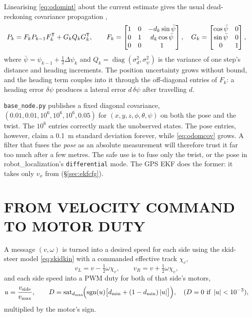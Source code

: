 Linearising \eqref{eq:odomint} about the current estimate gives the usual
dead-reckoning covariance propagation \cite{thrun2005probabilistic},
\begin{equation}\label{eq:odomcov}
P_k = F_k P_{k-1}F_k^{\mathsf T} + G_k Q_k G_k^{\mathsf T},\qquad
F_k=\begin{bmatrix}1&0&-d_k\sin\bar\psi\\0&1&d_k\cos\bar\psi\\0&0&1\end{bmatrix},\quad
G_k=\begin{bmatrix}\cos\bar\psi&0\\\sin\bar\psi&0\\0&1\end{bmatrix},
\end{equation}
where $\bar\psi=\psi_{k-1}+\frac12\Delta\psi_k$ and
$Q_k=\operatorname{diag}(\sigma_d^2,\sigma_{\psi}^2)$ is the variance of one
step's distance and heading increments. The position uncertainty grows
without bound, and the heading term couples into it through the off-diagonal
entries of $F_k$: a heading error $\delta\psi$ produces a lateral error
$d\,\delta\psi$ after travelling $d$.

\begin{remark}
\texttt{base\_node.py} publishes a fixed diagonal covariance,
$(0.01, 0.01, 10^6, 10^6, 10^6, 0.05)$ for $(x,y,z,\phi,\theta,\psi)$ on both
the pose and the twist. The $10^6$ entries correctly mark the unobserved
states. The pose entries, however, claim a \SI{0.1}{m} standard deviation
forever, while \eqref{eq:odomcov} grows. A filter that fuses the
 \emph{pose} as an absolute measurement will therefore trust it
far too much after a few metres. The safe use is to fuse only the twist, or the
pose in robot\_localization's \texttt{differential} mode. The GPS EKF does the
former: it takes only $v_x$ from  (\S\ref{sec:ekfcfg}).
\end{remark}

\section{FROM VELOCITY COMMAND TO MOTOR DUTY}
\label{sec:duty}

A  message $(v,\omega)$ is turned into a desired speed for each
side using the skid-steer model \eqref{eq:skidkin} with a commanded
effective track $\chi_c$,
\begin{equation}\label{eq:sidespeed}
v_L = v-\tfrac12\omega \chi_c,\qquad v_R = v+\tfrac12\omega \chi_c,
\end{equation}
and each side speed into a PWM duty for both of that side's motors,
\begin{equation}\label{eq:duty}
u=\frac{v_{\mathrm{side}}}{v_{\max}},\qquad
D = \operatorname{sat}_{d_{\max}}\!\Bigl(\operatorname{sgn}(u)\bigl[d_{\min}+(1-d_{\min})\left\lvert u \right\rvert\bigr]\Bigr),
\quad (D=0 \text{ if } \left\lvert u \right\rvert<10^{-3}),
\end{equation}
multiplied by the motor's sign.

